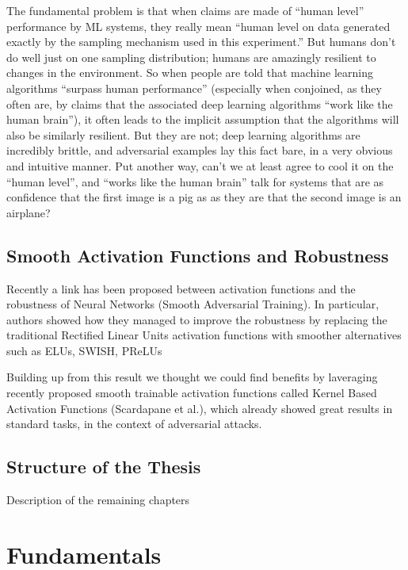 \documentclass[LaM,binding=0.6cm]{./packages/sapthesis/sapthesis}
\begin{document}
        The fundamental problem is that when claims are made of “human level” performance by ML systems, they really mean “human level on data generated exactly by the sampling mechanism used 
        in this experiment.” But humans don’t do well just on one sampling distribution; humans are amazingly resilient to changes in the environment. So when people are told that machine learning 
        algorithms “surpass human performance” (especially when conjoined, as they often are, by claims that the associated deep learning algorithms “work like the human brain”), 
        it often leads to the implicit assumption that the algorithms will also be similarly resilient. But they are not; deep learning algorithms are incredibly brittle, 
        and adversarial examples lay this fact bare, in a very obvious and intuitive manner. Put another way, can’t we at least agree to cool it on the “human level”, and “works 
        like the human brain” talk for systems that are as confidence that the first image is a pig as as they are that the second image is an airplane?



    \section{Smooth Activation Functions and Robustness}

        Recently a link has been proposed between activation functions and the robustness of
        Neural Networks (Smooth Adversarial Training). In particular, authors showed how they managed
        to improve the robustness by replacing the traditional Rectified Linear Units activation functions
        with smoother alternatives such as ELUs, SWISH, PReLUs
        
        Building up from this result we thought we could find benefits by laveraging recently proposed smooth
        trainable activation functions called Kernel Based Activation Functions (Scardapane et al.), 
        which already showed great results in standard tasks, in the context of adversarial attacks.
        
    \section{Structure of the Thesis}

        Description of the remaining chapters 


\chapter{Fundamentals}
\end{document}
